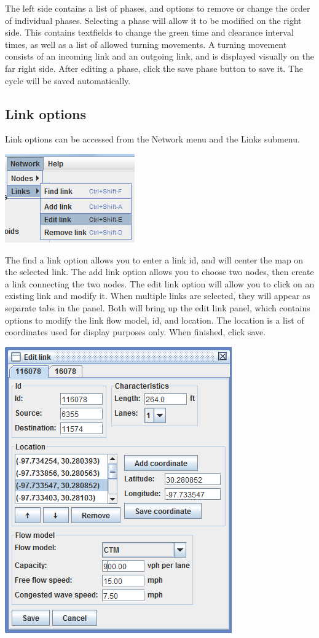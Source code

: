 The left side contains a list of phases, and options to remove or change the order of individual phases. Selecting a phase will allow it to be modified on the right side. This contains textfields to change the green time and clearance interval times, as well as a list of allowed turning movements. A turning movement consists of an incoming link and an outgoing link, and is displayed visually on the far right side. After editing a phase, click the save phase button to save it. The cycle will be saved automatically.

\subsection{Link options}

Link options can be accessed from the Network menu and the Links submenu.
\begin{center}
\includegraphics[scale=1]{images/editor8.png}
\end{center}

The find a link option allows you to enter a link id, and will center the map on the selected link. The add link option allows you to choose two nodes, then create a link connecting the two nodes. The edit link option will allow you to click on an existing link and modify it. When multiple links are selected, they will appear as separate tabs in the panel. 
Both will bring up the edit link panel, which contains options to modify the link flow model, id, and location. The location is a list of coordinates used for display purposes only. When finished, click save.
\begin{center}
\includegraphics[scale=1]{images/editor8b.png}
\end{center}

%